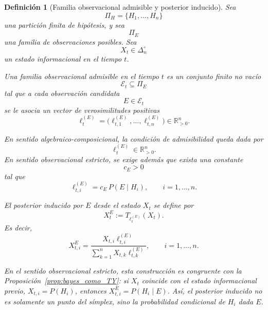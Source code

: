 \documentclass[12pt]{article}
\newtheorem{definicion}{Definición}[section]
\begin{document}
\begin{definicion}[Familia observacional admisible y posterior inducido]
Sea
\[
\Pi_H=\{H_1,\dots,H_n\}
\]
una partición finita de hipótesis, y sea
\[
\Pi_E
\]
una familia de observaciones posibles. Sea
\[
X_t\in\Delta_n^\circ
\]
un estado informacional en el tiempo \(t\).

Una \emph{familia observacional admisible} en el tiempo \(t\) es un conjunto finito no vacío
\[
\mathcal E_t\subseteq \Pi_E
\]
tal que a cada observación candidata
\[
E\in\mathcal E_t
\]
se le asocia un vector de verosimilitudes positivas
\[
\ell_t^{(E)}
=
\bigl(\ell_{t,1}^{(E)},\dots,\ell_{t,n}^{(E)}\bigr)
\in\mathbb R_{>0}^n.
\]

En sentido algebraico-composicional, la condición de admisibilidad queda dada por
\[
\ell_t^{(E)}\in\mathbb R_{>0}^n.
\]
En sentido observacional estricto, se exige además que exista una constante
\[
c_E>0
\]
tal que
\[
\ell_{t,i}^{(E)}
=
c_E\,P(E\mid H_i),
\qquad
i=1,\dots,n.
\]

El \emph{posterior inducido} por \(E\) desde el estado \(X_t\) se define por
\[
X_t^E
:=
T_{\ell_t^{(E)}}(X_t).
\]
Es decir,
\[
X_{t,i}^E
=
\frac{
X_{t,i}\ell_{t,i}^{(E)}
}{
\sum_{k=1}^n X_{t,k}\ell_{t,k}^{(E)}
},
\qquad
i=1,\dots,n.
\]

En el sentido observacional estricto, esta construcción es congruente con la Proposición~\ref{prop:bayes_como_TY}: si \(X_t\) coincide con el estado informacional previo, \(X_{t,i}=P(H_i)\), entonces \(X_{t,i}^E=P(H_i\mid E)\). Así, el posterior inducido no es solamente un punto del símplex, sino la probabilidad condicional de \(H_i\) dada \(E\).
\end{definicion}
\end{document}
